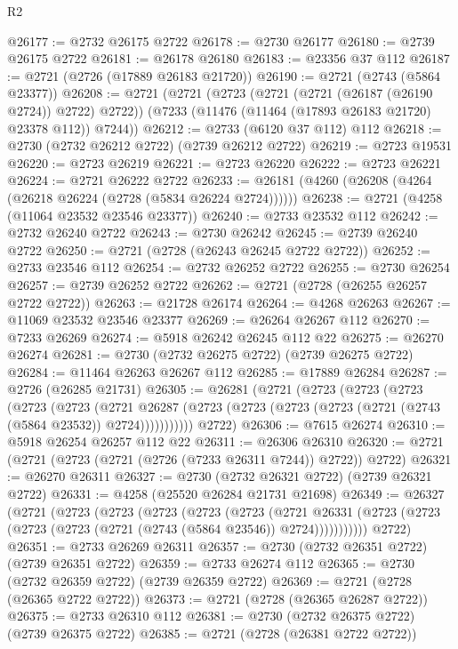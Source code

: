 \begin{lexlean}{R2}
\begin{coremodule}
@26177 := @2732 @26175 @2722
@26178 := @2730 @26177
@26180 := @2739 @26175 @2722
@26181 := @26178 @26180
@26183 := @23356 @37 @112
@26187 := @2721 (@2726 (@17889 @26183 @21720))
@26190 := @2721 (@2743 (@5864 @23377))
@26208 := @2721
    (@2721
      (@2723 (@2721 (@2721 (@26187 (@26190 @2724)) @2722) @2722))
      (@7233 (@11476 (@11464 (@17893 @26183 @21720) @23378 @112)) @7244))
@26212 := @2733 (@6120 @37 @112) @112
@26218 := @2730 (@2732 @26212 @2722) (@2739 @26212 @2722)
@26219 := @2723 @19531
@26220 := @2723 @26219
@26221 := @2723 @26220
@26222 := @2723 @26221
@26224 := @2721 @26222 @2722
@26233 := @26181 (@4260 (@26208 (@4264 (@26218 @26224 (@2728 (@5834 @26224 @2724))))))
@26238 := @2721 (@4258 (@11064 @23532 @23546 @23377))
@26240 := @2733 @23532 @112
@26242 := @2732 @26240 @2722
@26243 := @2730 @26242
@26245 := @2739 @26240 @2722
@26250 := @2721 (@2728 (@26243 @26245 @2722 @2722))
@26252 := @2733 @23546 @112
@26254 := @2732 @26252 @2722
@26255 := @2730 @26254
@26257 := @2739 @26252 @2722
@26262 := @2721 (@2728 (@26255 @26257 @2722 @2722))
@26263 := @21728 @26174
@26264 := @4268 @26263
@26267 := @11069 @23532 @23546 @23377
@26269 := @26264 @26267 @112
@26270 := @7233 @26269
@26274 := @5918 @26242 @26245 @112 @22
@26275 := @26270 @26274
@26281 := @2730 (@2732 @26275 @2722) (@2739 @26275 @2722)
@26284 := @11464 @26263 @26267 @112
@26285 := @17889 @26284
@26287 := @2726 (@26285 @21731)
@26305 := @26281
    (@2721
      (@2723
        (@2723
          (@2723
            (@2723
              (@2723
                (@2721
                  @26287
                  (@2723 (@2723 (@2723 (@2723 (@2721 (@2743 (@5864 @23532)) @2724)))))))))))
      @2722)
@26306 := @7615 @26274
@26310 := @5918 @26254 @26257 @112 @22
@26311 := @26306 @26310
@26320 := @2721 (@2721 (@2723 (@2721 (@2726 (@7233 @26311 @7244)) @2722)) @2722)
@26321 := @26270 @26311
@26327 := @2730 (@2732 @26321 @2722) (@2739 @26321 @2722)
@26331 := @4258 (@25520 @26284 @21731 @21698)
@26349 := @26327
    (@2721
      (@2723
        (@2723
          (@2723
            (@2723
              (@2723
                (@2721
                  @26331
                  (@2723 (@2723 (@2723 (@2723 (@2721 (@2743 (@5864 @23546)) @2724)))))))))))
      @2722)
@26351 := @2733 @26269 @26311
@26357 := @2730 (@2732 @26351 @2722) (@2739 @26351 @2722)
@26359 := @2733 @26274 @112
@26365 := @2730 (@2732 @26359 @2722) (@2739 @26359 @2722)
@26369 := @2721 (@2728 (@26365 @2722 @2722))
@26373 := @2721 (@2728 (@26365 @26287 @2722))
@26375 := @2733 @26310 @112
@26381 := @2730 (@2732 @26375 @2722) (@2739 @26375 @2722)
@26385 := @2721 (@2728 (@26381 @2722 @2722))

\end{coremodule}
\end{lexlean}
